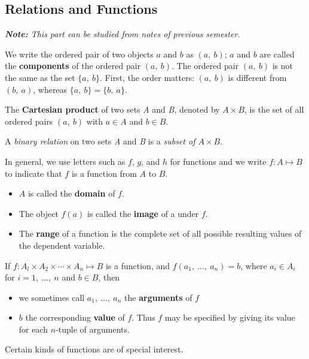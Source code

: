 \documentclass{article}
\begin{document}
\begin{multicols}{2}
\setlength{\columnsep}{1.5cm}
\setlength{\columnseprule}{0.2pt}

\section{Relations and Functions}

\textit{\textbf{Note:} This part can be studied from notes of previous semester.}

We write the ordered pair of two objects $a$ and $b$ as $(a,\ b)$; $a$ and $b$ are called the \textbf{components} of the ordered pair $(a,\ b)$. The ordered pair $(a,\ b)$ is not the same as the set $\{a,\ b\}$. First, the order matters: $(a,\ b)$ is different from $(b,\ a)$,  whereas $\{a,\ b\} = \{b,\ a\}$.

The \textbf{Cartesian product} of two sets \textit{A} and \textit{B}, denoted by $A \times B$, is the set of all ordered pairs $(a,\ b)$ with $a \in A$ and $b \in B$.

A \textit{binary relation} on two sets \textit{A} and \textit{B} is a \textit{subset of $A \times B$}.

In general, we use letters such as $f$, $g$, and $h$ for functions and we write $f : A \mapsto B$ to indicate that $f$ is a function from $A$ to $B$.
\begin{itemize}
    \item $A$ is called the \textbf{domain} of $f$.
    \item The object $f(a)$ is called the \textbf{image} of a under $f$.
    \item The \textbf{range} of a function is the complete set of all possible resulting values of the dependent variable.
\end{itemize}
If $f: A_l \times A_2 \times \cdots \times A_n \mapsto B$ is a function, and $f(a_1,\ ...,\ a_n) = b$, where $a_i \in A_i$ for $i = 1,\ ...,\ n$ and $b \in B$, then 
\begin{itemize}
    \item we sometimes call $a_1,\ ...,\ a_n$ the \textbf{arguments} of $f$
    \item $b$ the corresponding \textbf{value} of $f$. Thus $f$ may be specified by giving its value for each $n$-tuple of arguments.
\end{itemize}

Certain kinds of functions are of special interest.


\end{multicols}
\end{document}
